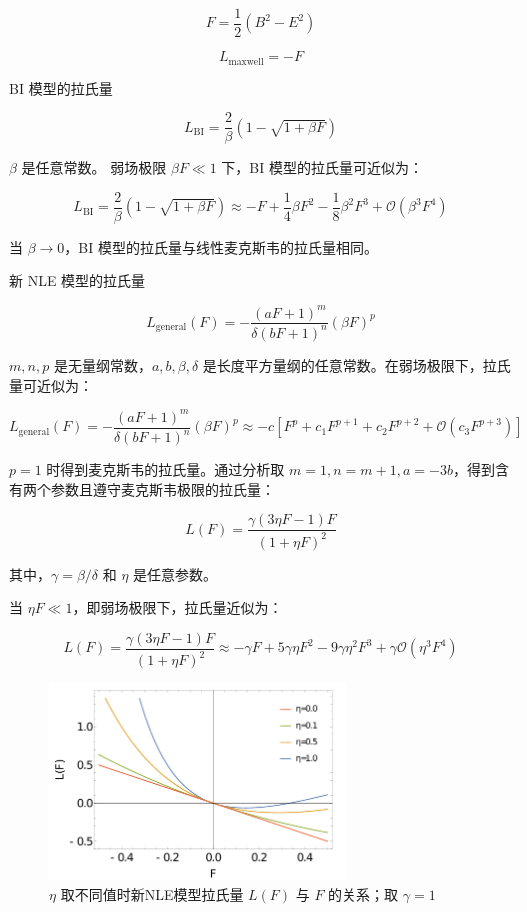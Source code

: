 \documentclass[aps,prl,preprint,groupedaddress,showkeys]{revtex4-2}
\begin{document}
$$
F
=\frac{1 }{2 } (B^2-E^2)
$$

$$
L_{\mathrm{maxwell}}
=-F
$$

BI 模型的拉氏量\cite{born1934quantum}

$$
L_{\mathrm{BI}}
=\frac{2 }{\beta } \left(1-\sqrt{1+\beta F} \right) 
$$

$\beta $ 是任意常数。   弱场极限 $\beta F\ll 1 $ 下，BI 模型的拉氏量可近似为：

$$
L_{\mathrm{BI}}
=\frac{2 }{\beta } \left(1-\sqrt{1+\beta F} \right)
\approx -F + \frac{1 }{4 } \beta F^2 - \frac{1 }{8 } \beta^2 F^3 +\mathcal{O}\left(\beta^3 F^4 \right) 
$$

当 $\beta\to 0 $，BI 模型的拉氏量与线性麦克斯韦的拉氏量相同。

新 NLE 模型的拉氏量

$$
L_{\mathrm{general}}(F)
=-\frac{\left(aF+1 \right)^m }{\delta(bF+1)^n } \left(\beta F \right)^p
$$

$m,n,p $ 是无量纲常数，$a,b,\beta,\delta $ 是长度平方量纲的任意常数。在弱场极限下，拉氏量可近似为：

$$
L_{\mathrm{general}}(F)
=-\frac{\left(aF+1 \right)^m }{\delta(bF+1)^n } \left(\beta F \right)^p
\approx -c\left[F^p + c_1 F^{p+1} +c_2 F^{p+2}  + \mathcal{O}\left(c_3 F^{p+3} \right) \right]
$$

$p=1 $ 时得到麦克斯韦的拉氏量。通过分析取 $m=1,n=m+1,a=-3b $，得到含有两个参数且遵守麦克斯韦极限的拉氏量：

$$
L(F)
=\frac{\gamma(3\eta F - 1 )F }{(1+\eta F)^2 }
$$

其中，$\gamma=\beta/\delta $ 和 $\eta $ 是任意参数。

当 $\eta F\ll 1 $，即弱场极限下，拉氏量近似为：

$$
L(F)
=\frac{\gamma(3\eta F - 1 )F }{(1+\eta F)^2 } 
\approx -\gamma F + 5\gamma \eta F^2 -9\gamma \eta^2 F^3 + \gamma\mathcal{O}\left(\eta^3F^4 \right) 
$$

\begin{figure}
    \centering
    \includegraphics[width=0.7\textwidth]{fig/fig1.png}
    \caption{$\eta$ 取不同值时新NLE模型拉氏量 $L(F)$ 与 $F$ 的关系；取 $\gamma=1$}
\end{figure}   
\end{document}
